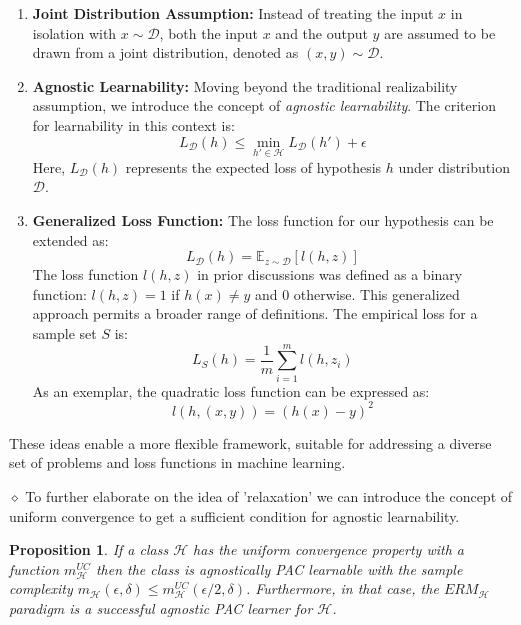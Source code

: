 \documentclass{article}
\newtheorem{proposition}[theorem]{Proposition}
\theoremstyle{remark}
\begin{document}
    \begin{enumerate}
        \item \textbf{Joint Distribution Assumption:} 
        Instead of treating the input \(x\) in isolation with \(x \sim \mathcal{D}\), both the input \(x\) and the output \(y\) are assumed to be drawn from a joint distribution, denoted as \((x,y) \sim \mathcal{D}\).
    
        \item \textbf{Agnostic Learnability:}
        Moving beyond the traditional realizability assumption, we introduce the concept of \textit{agnostic learnability}. The criterion for learnability in this context is:
        \[
        L_\mathcal{D}(h) \leq \min_{h' \in \mathcal{H}} L_\mathcal{D}(h') + \epsilon
        \]
        Here, \(L_\mathcal{D}(h)\) represents the expected loss of hypothesis \(h\) under distribution \(\mathcal{D}\).
    
        \item \textbf{Generalized Loss Function:}
        The loss function for our hypothesis can be extended as:
        \[
        L_\mathcal{D}(h) = \mathbb{E}_{z \sim \mathcal{D}} [l(h, z)]
        \]
        The loss function \(l(h,z)\) in prior discussions was defined as a binary function: \(l(h,z) = 1\) if \(h(x) \neq y\) and \(0\) otherwise. This generalized approach permits a broader range of definitions. The empirical loss for a sample set \(S\) is:
        \[
        L_S(h) = \frac{1}{m} \sum_{i=1}^{m} l(h, z_i)
        \]
        As an exemplar, the quadratic loss function can be expressed as:
        \[
        l(h, (x,y)) = (h(x) - y)^2
        \]
    \end{enumerate}
    
    These ideas enable a more flexible framework, suitable for addressing a diverse set of problems and loss functions in machine learning.

    $\diamond$ To further elaborate on the idea of 'relaxation' we can introduce the concept of uniform convergence to get a sufficient condition for agnostic learnability.

    \begin{proposition}
    If a class $\mathcal{H}$ has the uniform convergence property with a function $m^{UC}_{\mathcal{H}}$ then the class is agnostically
     PAC learnable with the sample complexity $m_{\mathcal{H}}(\epsilon,\delta)\leq m^{UC}_{\mathcal{H}}(\epsilon/2,\delta)$. Furthermore, in that case, the $ERM_{\mathcal{H}}$ paradigm is a successful 
     agnostic PAC learner for $\mathcal{H}$.
    \end{proposition}
\end{document}
